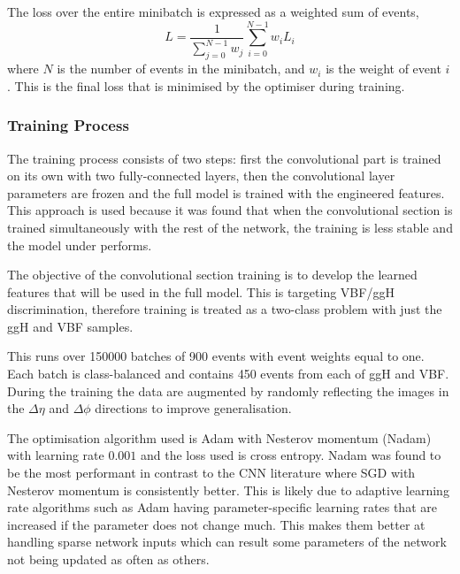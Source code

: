The loss over the entire minibatch is expressed as a weighted sum of events,
\begin{equation}
    L = \frac{1}{\sum_{j=0}^{N-1}w_{j}}\sum_{i=0}^{N-1}w_{i}L_{i}
\end{equation} 
where $N$ is the number of events in the minibatch, and $w_i$ is the weight of event $i$.
This is the final loss that is minimised by the optimiser during training. 



\subsubsection{Training Process}
The training process consists of two steps: first the convolutional part is trained on its own with two fully-connected layers, then the convolutional layer parameters are frozen and the full model is trained with the engineered features. This approach is used because it was found that when the convolutional section is trained simultaneously with the rest of the network, the training is less stable and the model under performs.

The objective of the convolutional section training is to develop the learned features that will be used in the full model. 
This is targeting VBF/ggH discrimination, therefore training is treated as a two-class problem with just the ggH and VBF samples.  

This runs over 150000 batches of 900 events with event weights equal to one. Each batch is class-balanced and contains 450 events from each of ggH and VBF.  
During the training the data are augmented by randomly reflecting the images in the $\Delta\eta$ and $\Delta\phi$ directions to improve generalisation. 

The optimisation algorithm used is Adam with Nesterov momentum (Nadam) with learning rate $0.001$ and the loss used is cross entropy. 
Nadam was found to be the most performant in contrast to the CNN literature where SGD with Nesterov momentum is consistently better. 
This is likely due to adaptive learning rate algorithms such as Adam having parameter-specific learning rates that are increased if the parameter does not change much. 
This makes them better at handling sparse network inputs which can result some parameters of the network not being updated as often as others. 



